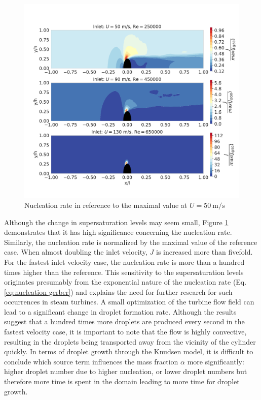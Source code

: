 \documentclass[12pt]{article}
\numberwithin{equation}{section}
\begin{document}
\begin{figure}[H]
    \centering
    \includegraphics[trim={0 40 0 50},clip,width=1.0\textwidth]{Figures/I_plot_speed_compare.pdf}
    \caption{Nucleation rate in reference to the maximal value at $U=50\: \mathrm{m/s}$}
    \label{f:cylinder_nucleation}
\end{figure}
Although the change in supersaturation levels may seem small, Figure \ref{f:cylinder_nucleation} demonstrates that it has high significance concerning the nucleation rate. Similarly, the nucleation rate is normalized by the maximal value of the reference case. When almost doubling the inlet velocity, $J$ is increased more than fivefold. For the fastest inlet velocity case, the nucleation rate is more than a hundred times higher than the reference. This sensitivity to the supersaturation levels originates presumably from the exponential nature of the nucleation rate (Eq. \ref{eq:nucleation gerber}) and explains the need for further research for such occurrences in steam turbines. A small optimization of the turbine flow field can lead to a significant change in droplet formation rate. Although the results suggest that a hundred times more droplets are produced every second in the fastest velocity case, it is important to note that the flow is highly convective, resulting in the droplets being transported away from the vicinity of the cylinder quickly. In terms of droplet growth through the Knudsen model, it is difficult to conclude which source term influences the mass fraction $\alpha$ more significantly: higher droplet number due to higher nucleation, or lower droplet numbers but therefore more time is spent in the domain leading to more time for droplet growth.
\end{document}
